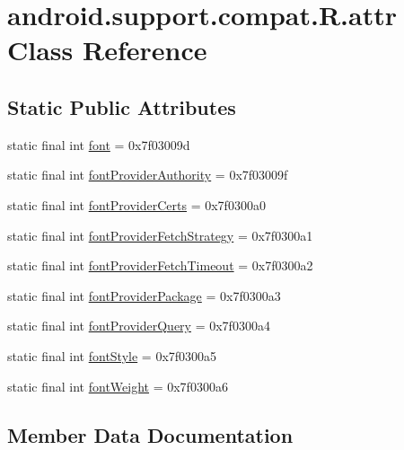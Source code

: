 \hypertarget{classandroid_1_1support_1_1compat_1_1R_1_1attr}{}\section{android.\+support.\+compat.\+R.\+attr Class Reference}
\label{classandroid_1_1support_1_1compat_1_1R_1_1attr}
\subsection*{Static Public Attributes}
\begin{DoxyCompactItemize}
\item 
static final int \mbox{\hyperlink{classandroid_1_1support_1_1compat_1_1R_1_1attr_a81787f6b5888bbbadbced1dcdf540898}{font}} = 0x7f03009d
\item 
static final int \mbox{\hyperlink{classandroid_1_1support_1_1compat_1_1R_1_1attr_a385b42c0dfc03b03c265fcfd7769c4bd}{font\+Provider\+Authority}} = 0x7f03009f
\item 
static final int \mbox{\hyperlink{classandroid_1_1support_1_1compat_1_1R_1_1attr_a596b9b8b873c6ad0f117df870c8c3f21}{font\+Provider\+Certs}} = 0x7f0300a0
\item 
static final int \mbox{\hyperlink{classandroid_1_1support_1_1compat_1_1R_1_1attr_aef6cba42cf72879fa76c23ac333b803c}{font\+Provider\+Fetch\+Strategy}} = 0x7f0300a1
\item 
static final int \mbox{\hyperlink{classandroid_1_1support_1_1compat_1_1R_1_1attr_ac799f7df13e58e586ee80b9d690de917}{font\+Provider\+Fetch\+Timeout}} = 0x7f0300a2
\item 
static final int \mbox{\hyperlink{classandroid_1_1support_1_1compat_1_1R_1_1attr_a1f9768a93919a8e73aa7ff92eb3ccccc}{font\+Provider\+Package}} = 0x7f0300a3
\item 
static final int \mbox{\hyperlink{classandroid_1_1support_1_1compat_1_1R_1_1attr_a520711f2c65e1d68d359126541844b6a}{font\+Provider\+Query}} = 0x7f0300a4
\item 
static final int \mbox{\hyperlink{classandroid_1_1support_1_1compat_1_1R_1_1attr_aafb47e665f110a6e8fd90833aefd0e1f}{font\+Style}} = 0x7f0300a5
\item 
static final int \mbox{\hyperlink{classandroid_1_1support_1_1compat_1_1R_1_1attr_ab95e33bc7552ac24227086aae1de1973}{font\+Weight}} = 0x7f0300a6
\end{DoxyCompactItemize}


\subsection{Member Data Documentation}
\mbox{\label{classandroid_1_1support_1_1compat_1_1R_1_1attr_a81787f6b5888bbbadbced1dcdf540898}} 
